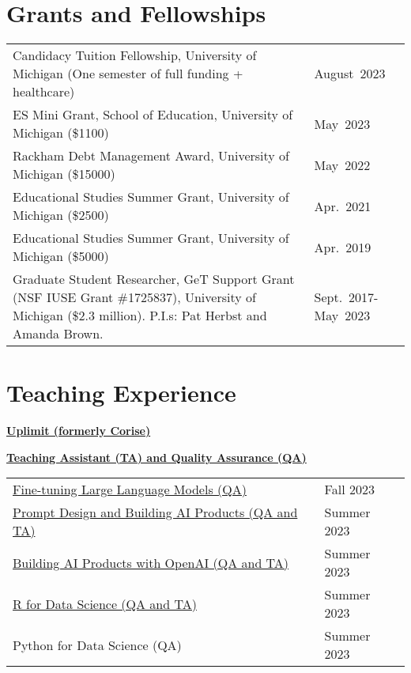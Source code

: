 \documentclass[margin,line]{res}
\renewcommand{\subsection}[1]{%
      \par\vspace{3pt}%
      \underline{\normalsize\bfseries #1}%
      \par\vspace{3pt}%
    }
\begin{document}
\begin{resume}
\section{\sc Grants and Fellowships} 
  
\begin{tabular}{@{}p{4.0in}p{1.0in}}
  Candidacy Tuition Fellowship, University of Michigan (One semester of full funding + healthcare) & \multirow{1}{1in}{August~2023}\\
  ES Mini Grant, School of Education, University of Michigan (\$1100) & \multirow{1}{1in}{May~2023}\\
  Rackham Debt Management Award, University of Michigan (\$15000) & \multirow{1}{1in}{May~2022}\\
  Educational Studies Summer Grant, University of Michigan (\$2500) & \multirow{1}{1in}{Apr.~2021}\\
  Educational Studies Summer Grant, University of Michigan (\$5000) & \multirow{1}{1in}{Apr.~2019}\\
  Graduate Student Researcher, GeT Support Grant (NSF IUSE Grant \#1725837), University of Michigan (\$2.3 million). P.I.s: Pat Herbst and Amanda Brown. & \multirow{1}{1in}{Sept.~2017-May~2023}\\
\end{tabular}
  

\section{\sc Teaching Experience} 

{\bf \href{https://uplimit.com/}{Uplimit (formerly Corise)}}

\subsection{\sc Teaching Assistant (TA) and Quality Assurance (QA)}
\begin{tabular}{@{}p{4.0in}p{1.0in}}
  \href{https://uplimit.com/course/fine-tuning-language-models}{Fine-tuning Large Language Models (QA)} & \multirow{1}{1in}{Fall 2023}\\
  \href{https://uplimit.com/course/prompt-design-building-ai-products}{Prompt Design and Building AI Products (QA and TA)} & \multirow{1}{1in}{Summer 2023}\\
  \href{https://uplimit.com/course/building-ai-products-with-openai}{Building AI Products with OpenAI (QA and TA)} & \multirow{1}{1in}{Summer 2023}\\
  \href{https://github.com/ramnathv/corise-r-for-ds}{R for Data Science (QA and TA)} & \multirow{1}{1in}{Summer 2023}\\
  Python for Data Science (QA) & Summer 2023\\
\end{tabular}
\begin{tabular}{@{}p{4in}p{1.0in}}


\end{tabular}
\end{resume}
\end{document}
